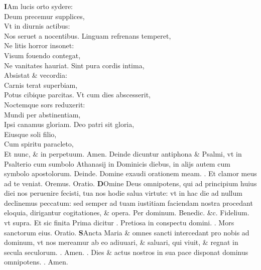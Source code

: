 \documentclass[a5paper,10pt]{book}
\begin{document}
\begin{multicols*}{2}
\vspace{-.25em}
\lettrine[lines=2]{\bfseries \color{red} I}{}Am lucis orto sydere:\\Deum precemur supplices,\\Vt in diurnis actibus:\\Nos seruet a nocentibus.
\newline \color{red} L\color{black}inguam refrenans temperet,\\Ne litis horror insonet:\\Visum fouendo contegat,\\Ne vanitates hauriat.
\newline \color{red} S\color{black}int pura cordis intima,\\Absistat \& vecordia:\\Carnis terat superbiam,\\Potus cibique parcitas.
\newline \color{red} V\color{black}t cum dies abscesserit,\\Noctemque sors reduxerit:\\Mundi per abstinentiam,\\Ipsi canamus gloriam.
\newline \color{red} D\color{black}eo patri sit gloria,\\Eiusque soli filio,\\Cum spiritu paracleto,\\Et nunc, \& in perpetuum. Amen.
\newline {} \color{red} Deinde dicuntur %
antiphona \& Psalmi, vt in Psalterio cum sumbolo Athanasij in Dominicis diebus, in alijs autem cum symbolo apostolorum. Deinde. \color{black} Domine exaudi orationem meam. \color{red} \Rbar . \color{black} Et clamor meus ad te veniat. \color{red} O\color{black}remus. \color{red} Oratio. \color{black}
\vspace{-.25em}
\lettrine[lines=2]{\bfseries \color{red} D}{}Omine Deus omnipotens, qui ad principium huius diei nos peruenire fecisti, tua nos hodie salua virtute: vt in hac die ad nullum declinemus peccatum: sed semper ad tuam iustitiam faciendam nostra procedant eloquia, dirigantur cogitationes, \& opera. Per dominum. Benedic. \color{red} \&c. \color{black} Fidelium. \color{red} vt supra.
Et sic finita Prima dicitur \Vbar . \color{black} Pretiosa in conspectu domini. \color{red} \Rbar . \color{black} Mors sanctorum eius. \color{red} Oratio. \color{black}
\vspace{-1.25em}
\lettrine[lines=2]{\bfseries \color{red} S}{}Ancta Maria \& omnes sancti intercedant pro nobis ad dominum, vt nos mereamur ab eo adiuuari, \& saluari, qui viuit, \& regnat in secula seculorum. \color{red} \Rbar . \color{black} Amen. \color{red} \Vbar . \color{black} Dies \& actus nostros in sua pace disponat dominus omnipotens. \color{red} \Rbar . \color{black} Amen.

\end{multicols*}
\end{document}
